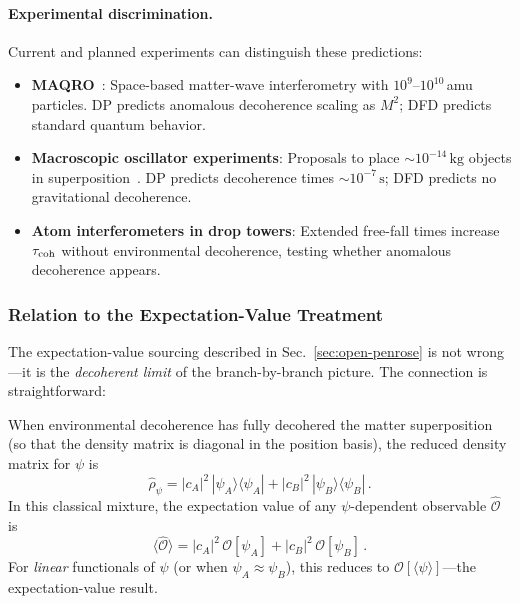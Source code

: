 \paragraph{Experimental discrimination.}
Current and planned experiments can distinguish these predictions:
\begin{itemize}
\item \textbf{MAQRO}~\cite{MAQRO2022}: Space-based matter-wave interferometry with $10^{9}$--$10^{10}$\,amu particles.  DP predicts anomalous decoherence scaling as $M^2$; DFD predicts standard quantum behavior.
\item \textbf{Macroscopic oscillator experiments}: Proposals to place $\sim$$10^{-14}\,\text{kg}$ objects in superposition~\cite{Bouwmeester2003}.  DP predicts decoherence times $\sim 10^{-7}\,\text{s}$; DFD predicts no gravitational decoherence.
\item \textbf{Atom interferometers in drop towers}: Extended free-fall times increase $\tau_{\rm coh}$ without environmental decoherence, testing whether anomalous decoherence appears.
\end{itemize}

\subsubsection{Relation to the Expectation-Value Treatment}\label{sec:expect-value-limit}

The expectation-value sourcing described in Sec.~\ref{sec:open-penrose} is not wrong---it is the \emph{decoherent limit} of the branch-by-branch picture.  The connection is straightforward:

When environmental decoherence has fully decohered the matter superposition (so that the density matrix is diagonal in the position basis), the reduced density matrix for $\psi$ is
\begin{equation}
\hat\rho_\psi = |c_A|^2\,|\psi_A\rangle\langle\psi_A| + |c_B|^2\,|\psi_B\rangle\langle\psi_B|\,.
\end{equation}
In this classical mixture, the expectation value of any $\psi$-dependent observable $\hat{\mathcal{O}}$ is
\begin{equation}
\langle\hat{\mathcal{O}}\rangle = |c_A|^2\,\mathcal{O}[\psi_A] + |c_B|^2\,\mathcal{O}[\psi_B]\,.
\end{equation}
For \emph{linear} functionals of $\psi$ (or when $\psi_A \approx \psi_B$), this reduces to $\mathcal{O}[\langle\psi\rangle]$---the expectation-value result.

